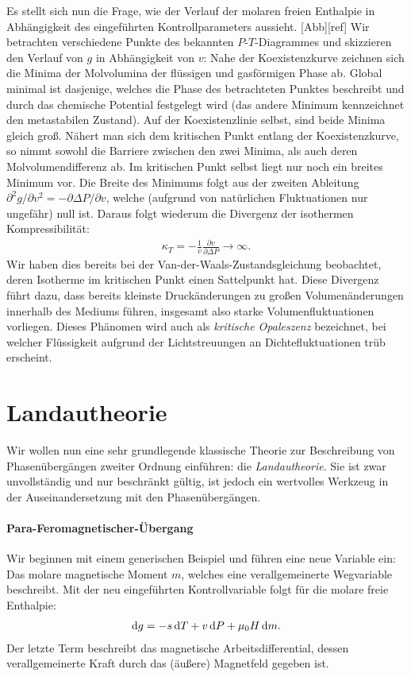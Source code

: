 Es stellt sich nun die Frage, wie der Verlauf der molaren freien Enthalpie in Abhängigkeit des eingeführten Kontrollparameters aussieht. [Abb][ref]
Wir betrachten verschiedene Punkte des bekannten $P$-$T$-Diagrammes und skizzieren den Verlauf von $g$ in Abhängigkeit von $v$:
Nahe der Koexistenzkurve zeichnen sich die Minima der Molvolumina der flüssigen und gasförmigen Phase ab. Global minimal ist dasjenige, welches die Phase des betrachteten Punktes beschreibt und durch das chemische Potential festgelegt wird (das andere Minimum kennzeichnet den metastabilen Zustand). Auf der Koexistenzlinie selbst, sind beide Minima gleich groß. Nähert man sich dem kritischen Punkt entlang der Koexistenzkurve, so nimmt sowohl die Barriere zwischen den zwei Minima, als auch deren Molvolumendifferenz ab.
Im kritischen Punkt selbst liegt nur noch ein breites Minimum vor. Die Breite des Minimums folgt aus der zweiten Ableitung $\partial^2 g/\partial v^2=-\partial\Delta P/\partial v$, welche (aufgrund von natürlichen Fluktuationen nur ungefähr) null ist. 
Daraus folgt wiederum die Divergenz der isothermen Kompressibilität:
\begin{align*}
    \kappa_T=-\frac{1}{v}\frac{\partial v}{\partial\Delta P} \rightarrow \infty.
\end{align*}
Wir haben dies bereits bei der Van-der-Waals-Zustandsgleichung beobachtet, deren Isotherme im kritischen Punkt einen Sattelpunkt hat.
Diese Divergenz führt dazu, dass bereits kleinste Druckänderungen zu großen Volumenänderungen innerhalb des Mediums führen, insgesamt also starke Volumenfluktuationen vorliegen. Dieses Phänomen wird auch als \emph{kritische Opaleszenz} bezeichnet, bei welcher Flüssigkeit aufgrund der Lichtstreuungen an Dichtefluktuationen trüb erscheint. 

\section{Landautheorie}
Wir wollen nun eine sehr grundlegende klassische Theorie zur Beschreibung von Phasenübergängen zweiter Ordnung einführen: die \emph{Landautheorie}. Sie ist zwar unvollständig und nur beschränkt gültig, ist jedoch ein wertvolles Werkzeug in der Auseinandersetzung mit den Phasenübergängen.
\paragraph*{Para-Feromagnetischer-Übergang}
Wir beginnen mit einem generischen Beispiel und führen eine neue Variable ein:
Das molare magnetische Moment $m$, welches eine verallgemeinerte Wegvariable beschreibt.
Mit der neu eingeführten Kontrollvariable folgt für die molare freie Enthalpie:
\begin{align*}
    \mathop{}\!\mathrm{d} g=-s\mathop{}\!\mathrm{d} T+v\mathop{}\!\mathrm{d} P+\mu_0H\mathop{}\!\mathrm{d} m.
\end{align*}
Der letzte Term beschreibt das magnetische Arbeitsdifferential, dessen verallgemeinerte Kraft durch das (äußere) Magnetfeld gegeben ist. 

